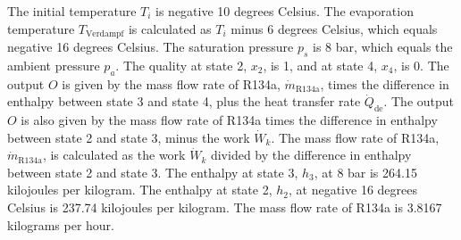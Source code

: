 The initial temperature \( T_i \) is negative 10 degrees Celsius. The evaporation temperature \( T_{\text{Verdampf}} \) is calculated as \( T_i \) minus 6 degrees Celsius, which equals negative 16 degrees Celsius. The saturation pressure \( p_s \) is 8 bar, which equals the ambient pressure \( p_a \). The quality at state 2, \( x_2 \), is 1, and at state 4, \( x_4 \), is 0. The output \( O \) is given by the mass flow rate of R134a, \( \dot{m}_{\text{R134a}} \), times the difference in enthalpy between state 3 and state 4, plus the heat transfer rate \( \dot{Q}_{\text{de}} \). The output \( O \) is also given by the mass flow rate of R134a times the difference in enthalpy between state 2 and state 3, minus the work \( \dot{W}_k \). The mass flow rate of R134a, \( \dot{m}_{\text{R134a}} \), is calculated as the work \( \dot{W}_k \) divided by the difference in enthalpy between state 2 and state 3. The enthalpy at state 3, \( h_3 \), at 8 bar is 264.15 kilojoules per kilogram. The enthalpy at state 2, \( h_2 \), at negative 16 degrees Celsius is 237.74 kilojoules per kilogram. The mass flow rate of R134a is 3.8167 kilograms per hour.